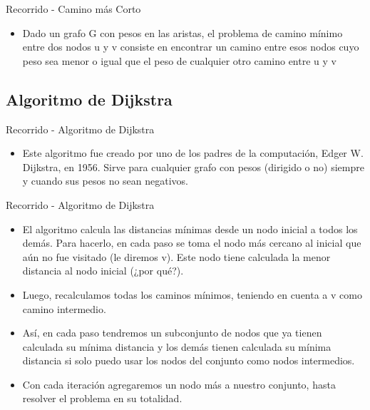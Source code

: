 \documentclass[handout]{beamer} %
\begin{document}
\begin{frame}{Recorrido - Camino más Corto}
  \begin{itemize}
    \item Dado un grafo G con pesos en las aristas, el problema de camino
mínimo entre dos nodos u y v consiste en encontrar un camino entre
esos nodos cuyo peso sea menor o igual que el peso de cualquier otro
camino entre u y v

  \end{itemize}

\end{frame}

\subsection{Algoritmo de Dijkstra}
\begin{frame}{Recorrido - Algoritmo de Dijkstra}
  \begin{itemize}
    \item Este algoritmo fue creado por uno de los padres de la computación,
Edger W. Dijkstra, en 1956. Sirve para cualquier grafo con pesos
(dirigido o no) siempre y cuando sus pesos no sean negativos.

  \end{itemize}

\end{frame}

\begin{frame}{Recorrido - Algoritmo de Dijkstra}
  \begin{itemize}
    \item  El algoritmo calcula las distancias mínimas desde un nodo inicial
a todos los demás. Para hacerlo, en cada paso se toma el nodo
más cercano al inicial que aún no fue visitado (le diremos v). Este
nodo tiene calculada la menor distancia al nodo inicial (¿por
qué?).
\item Luego, recalculamos todas los caminos mínimos, teniendo en
cuenta a v como camino intermedio.
\item Así, en cada paso tendremos un subconjunto de nodos que ya
tienen calculada su mínima distancia y los demás tienen
calculada su mínima distancia si solo puedo usar los nodos del
conjunto como nodos intermedios.
\item Con cada iteración agregaremos un nodo más a nuestro conjunto,
hasta resolver el problema en su totalidad.
  \end{itemize}

\end{frame}
\end{document}
